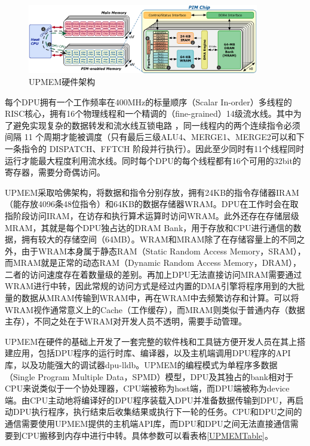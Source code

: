 \begin{figure}[!htbp]
	\centering
    \includegraphics[width=0.9\textwidth]{figures/UPMEMArch.png}
    \caption{UPMEM硬件架构}
	\label{UPMEMArch}
\end{figure}

每个DPU拥有一个工作频率在400MHz的标量顺序（Scalar In-order）多线程的RISC核心，拥有16个物理线程和一个精调的（fine-grained）14级流水线。其中为了避免实现复杂的数据转发和流水线互锁电路 \cite{UPMEMHotChips}，同一线程内的两个连续指令必须间隔 11 个周期才能被调度（只有最后三级ALU4、MERGE1、MERGE2可以和下一条指令的 DISPATCH、FFTCH 阶段并行执行）。因此至少同时有11个线程同时运行才能最大程度利用流水线。同时每个DPU的每个线程都有16个可用的32bit的寄存器，需要分奇偶访问。

UPMEM采取哈佛架构，将数据和指令分别存放，拥有24KB的指令存储器IRAM（能存放4096条48位指令）和64KB的数据存储器WRAM。DPU在工作时会在取指阶段访问IRAM，在访存和执行算术运算时访问WRAM。此外还存在存储层级MRAM，其就是每个DPU独占达的DRAM Bank，用于存放和CPU进行通信的数据，拥有较大的存储空间（64MB）。WRAM和MRAM除了在存储容量上的不同之外，由于WRAM本身属于静态RAM（Static Random Access Memory，SRAM），而MRAM就是正常的动态RAM（Dynamic Random Access Memory，DRAM），二者的访问速度存在着数量级的差别。再加上DPU无法直接访问MRAM需要通过WRAM进行中转，因此常规的访问方式是经过内置的DMA引擎将程序用到的大批量的数据从MRAM传输到WRAM中，再在WRAM中去频繁访存和计算。可以将WRAM视作通常意义上的Cache（工作缓存），而MRAM则类似于普通内存（数据主存），不同之处在于WRAM对开发人员不透明，需要手动管理。

UPMEM在硬件的基础上开发了一套完整的软件栈和工具链方便开发人员在其上搭建应用，包括DPU程序的运行时库、编译器，以及主机端调用DPU程序的API库，以及功能强大的调试器dpu-lldb。UPMEM的编程模式为单程序多数据（Single Program Multiple Data，SPMD）模型，DPU及其独占的bank相对于CPU来说类似于一个协处理器，CPU端被称为host端，而DPU端被称为device端。由CPU主动地将编译好的DPU程序装载入DPU并准备数据传输到DPU，再启动DPU执行程序，执行结束后收集结果或执行下一轮的任务。CPU和DPU之间的通信需要使用UPMEM提供的主机端API库，而DPU和DPU之间无法直接通信需要到CPU搬移到内存中进行中转。具体参数可以看表格\ref{UPMEMTable}。

